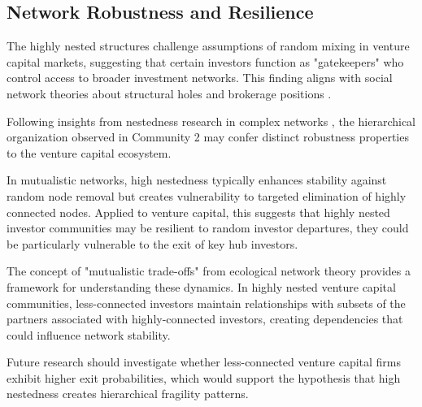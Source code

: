 \subsection{Network Robustness and Resilience}

The highly nested structures challenge assumptions of random mixing in venture capital markets, suggesting that certain investors function as "gatekeepers" who control access to broader investment networks. This finding aligns with social network theories about structural holes and brokerage positions \cite{Borgatti2011}.

Following insights from nestedness research in complex networks \cite{Mariani2019}, the hierarchical organization observed in Community 2 may confer distinct robustness properties to the venture capital ecosystem. 

In mutualistic networks, high nestedness typically enhances stability against random node removal but creates vulnerability to targeted elimination of highly connected nodes. Applied to venture capital, this suggests that highly nested investor communities may be resilient to random investor departures, they could be particularly vulnerable to the exit of key hub investors.

The concept of "mutualistic trade-offs" from ecological network theory provides a framework for understanding these dynamics. In highly nested venture capital communities, less-connected investors maintain relationships with subsets of the partners associated with highly-connected investors, creating dependencies that could influence network stability. 

Future research should investigate whether less-connected venture capital firms exhibit higher exit probabilities, which would support the hypothesis that high nestedness creates hierarchical fragility patterns.

\pagebreak